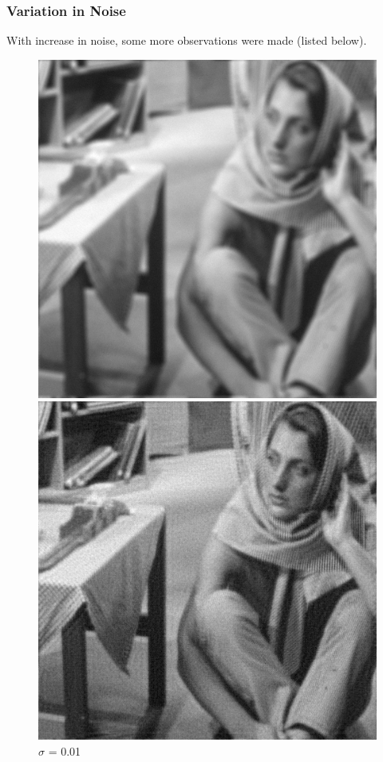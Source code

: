 \documentclass{article}
\begin{document}
    \subsubsection*{Variation in Noise}
    With increase in noise, some more observations were made (listed below).\\[10pt]
    \begin{figure}[!htb]
      \includegraphics[scale=.28]{./deblurring/0_01/final.png}
      \caption{\(\sigma\) = 0.01}
    \endminipage\hfill
      \includegraphics[scale=.28]{./deblurring/0_01/recover.png}

\end{figure}
\end{document}
